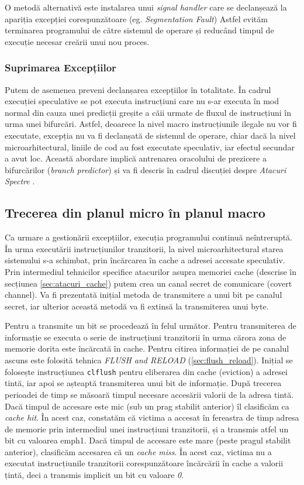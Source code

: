 O metodă alternativă este instalarea unui \emph{signal handler} care se
declanșează la apariția excepției corespunzătoare (eg. \emph{Segmentation Fault})
Astfel evităm terminarea programului de către sistemul de operare și reducând 
timpul de execuție necesar creării unui nou proces.

\subsubsection{Suprimarea Excepțiilor}

Putem de asemenea preveni declanșarea excepțiilor în totalitate. În cadrul
execuției speculative se pot executa instrucțiuni care nu s-ar executa în mod
normal din cauza unei predicții greșite a căii urmate de fluxul de instrucțiuni
în urma unei bifurcări. Astfel, deoarece la nivel macro instrucțiunile ilegale
nu vor fi executate, excepția nu va fi declanșată de sistemul de operare, chiar
dacă la nivel microarhitectural, liniile de cod au fost executate speculativ,
iar efectul secundar a avut loc. Această abordare implică antrenarea oracolului
de prezicere a bifurcărilor (\emph{branch predictor}) și va fi descris în
cadrul discuției despre \emph{Atacuri Spectre} \cite{spectre2019}.

\subsection{Trecerea din planul micro în planul macro}\label{sec:step_receive}

Ca urmare a gestionării excepțiilor, execuția programului continuă
neîntreruptă. În urma executării instrucțiunilor tranzitorii, la nivel
microarhitectural starea sistemului s-a schimbat, prin încărcarea în cache a
adresei accesate speculativ. Prin intermediul tehnicilor specifice atacurilor
asupra memoriei cache (descrise în secțiunea \ref{sec:atacuri_cache}) putem crea un
canal secret de comunicare (covert channel). Va fi prezentată inițial metoda de
transmitere a unui bit pe canalul secret, iar ulterior această metodă va fi
extinsă la transmiterea unui byte.

Pentru a transmite un bit se procedează în felul următor. Pentru transmiterea
de informație se executa o serie de instrucțiuni tranzitorii în urma cărora
zona de memorie dorita este încărcată în cache. Pentru citirea informației de
pe canalul ascuns este folosită tehnica \emph{FLUSH and RELOAD}
(\ref{sec:flush_reload}). Inițial se folosește instrucțiunea \texttt{clflush}
pentru eliberarea din cache (eviction) a adresei tintă, iar apoi se așteaptă
transmiterea unui bit de informație. După trecerea perioadei de timp se măsoară
timpul necesare accesării valorii de la adresa tintă. Dacă timpul de accesare
este mic (sub un prag stabilit anterior) îl clasificăm ca \emph{cache hit}. În
acest caz, constatăm că victima a accesat în fereastra de timp adresa de
memorie prin intermediul unei instrucțiuni tranzitorii, și a transmis atfel un
bit cu valoarea emph{1}. Dacă timpul de accesare este mare (peste pragul
stabilit anterior), clasificăm accesarea că un \emph{cache miss}. În acest caz,
victima nu a executat instrucțiunile tranzitorii corespunzătoare încărcării în
cache a valorii țintă, deci a transmis implicit un bit cu valoare \emph{0}.

